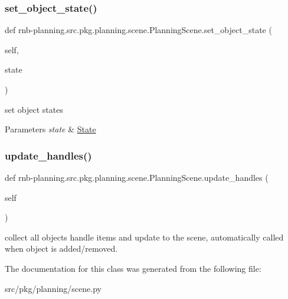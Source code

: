 \subsubsection{\texorpdfstring{set\+\_\+object\+\_\+state()}{set\_object\_state()}}
{\footnotesize\ttfamily def rnb-\/planning.\+src.\+pkg.\+planning.\+scene.\+Planning\+Scene.\+set\+\_\+object\+\_\+state (\begin{DoxyParamCaption}\item[{}]{self,  }\item[{}]{state }\end{DoxyParamCaption})}



set object states 


\begin{DoxyParams}{Parameters}
{\em state} & \hyperlink{classrnb-planning_1_1src_1_1pkg_1_1planning_1_1scene_1_1_state}{State} \\
\hline
\end{DoxyParams}
\mbox{\label{classrnb-planning_1_1src_1_1pkg_1_1planning_1_1scene_1_1_planning_scene_aa87ad00baefece92548c6c8b6e720741}} 
\subsubsection{\texorpdfstring{update\+\_\+handles()}{update\_handles()}}
{\footnotesize\ttfamily def rnb-\/planning.\+src.\+pkg.\+planning.\+scene.\+Planning\+Scene.\+update\+\_\+handles (\begin{DoxyParamCaption}\item[{}]{self }\end{DoxyParamCaption})}



collect all objects\textquotesingle{} handle items and update to the scene, automatically called when object is added/removed. 



The documentation for this class was generated from the following file\+:\begin{DoxyCompactItemize}
\item 
src/pkg/planning/scene.\+py\end{DoxyCompactItemize}
